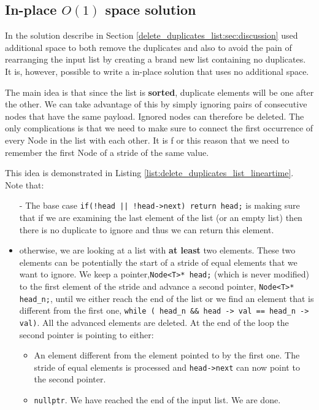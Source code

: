 


\subsection{In-place $O(1)$ space solution}
\label{delete_duplicates_list:sec:linear_space}
In the solution describe in Section \ref{delete_duplicates_list:sec:discussion} used additional space to both remove the duplicates and also to avoid the pain of rearranging the input list by creating a brand new list containing no duplicates. It is, however,  possible to write a in-place solution that uses no additional space. 

The main idea is that since the list is \textbf{sorted}, duplicate elements will be one after the other. We can take advantage of this by simply ignoring pairs of consecutive nodes that have the same payload. Ignored nodes can therefore be deleted. The only complications is that we need to make sure to connect the first occurrence of every Node in the list with each other. It is f or this reason that we need to remember the first Node of a stride of the same value.

This idea is demonstrated in Listing \ref{list:delete_duplicates_list_lineartime}. Note that:

\begin{itemize}
	\item[-] The base case \lstinline[columns=fixed]{if(!head || !head->next) return head;} is making sure that if we are examining the last element of the list (or an empty list) then there is no duplicate to ignore and thus we can return this element.
	\item[-] otherwise, we are looking at a list with \textbf{at least} two elements. These two elements can be potentially the start of a stride of equal elements that we want to ignore. We keep a pointer,\lstinline[columns=fixed]{Node<T>* head;} (which is never modified) to the first element  of the stride and advance a second pointer, \lstinline[columns=fixed]{Node<T>* head_n;}, until we either reach the end of the list or we find an element that is different from the first one, \lstinline[columns=fixed]{while ( head_n && head -> val == head_n -> val)}. All the advanced elements are deleted. At the end of the loop the second pointer  is pointing to either:
	\begin{itemize}
		\item[-] An element different from the element pointed to  by the first one. The stride of equal elements is processed and  \lstinline[columns=fixed]{head->next} can now point to the second pointer.
		\item[-] \lstinline[columns=fixed]{nullptr}. We have reached the end of the input list. We are done.
	\end{itemize}
\end{itemize}


